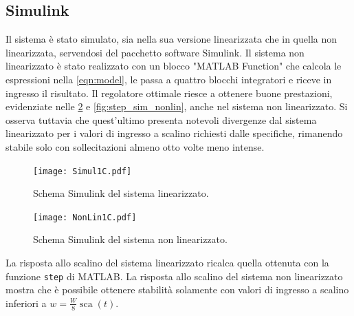 \documentclass[a4paper]{article}
\DeclareMathOperator*{\sca}{\textrm{sca}}
\begin{document}
\subsection{Simulink}
Il sistema è stato simulato, sia nella sua versione linearizzata che in quella non linearizzata, servendosi del pacchetto software Simulink. 
Il sistema non linearizzato è stato realizzato con un blocco "MATLAB Function" che calcola le espressioni nella \cref{eqn:model}, le passa a quattro blocchi integratori e riceve in ingresso il risultato.
Il regolatore ottimale riesce a ottenere buone prestazioni, evidenziate nelle \cref{fig:sim_nonlin} e \cref{fig:step_sim_nonlin}, anche nel sistema non linearizzato.
Si osserva tuttavia che quest'ultimo presenta notevoli divergenze dal sistema linearizzato per i valori di ingresso a scalino richiesti dalle specifiche, rimanendo stabile solo con sollecitazioni almeno otto volte meno intense.
\begin{figure}[h!]
    \centering
    \texttt{[image: Simul1C.pdf]}
    \caption{Schema Simulink del sistema linearizzato.}
    \label{fig:sim_lin}
\end{figure}
\begin{figure}[h!]
    \centering
    \texttt{[image: NonLin1C.pdf]}
    \caption{Schema Simulink del sistema non linearizzato. }
    \label{fig:sim_nonlin}
\end{figure}
La risposta allo scalino del sistema linearizzato ricalca quella ottenuta con la funzione \texttt{step} di MATLAB.
La risposta allo scalino del sistema non linearizzato mostra che è possibile ottenere stabilità solamente con valori di ingresso a scalino inferiori a $w = \frac{W}{8} \sca(t)$. 
\end{document}
